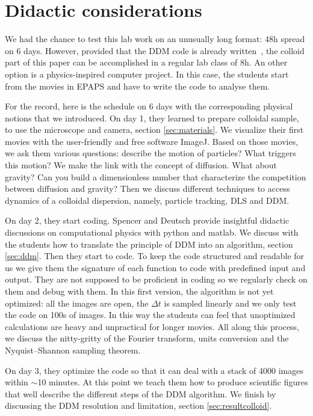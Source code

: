 \documentclass[prb,reprint,amsmath,amssymb]{revtex4-1}
\newcommand{\tg}[1]{{\color{magenta}#1}} %
\begin{document}
\section{\label{sec:didac}Didactic considerations}
\tg{We had the chance to test this lab work on an unusually long format: 48h spread on 6 days. However, provided that the DDM code is already written~\cite{code_github}, the colloid part of this paper can be accomplished in a regular lab class of 8h. An other option is a physics-inspired computer project. In this case, the students start from the movies in EPAPS and have to write the code to analyse them.}

For the record, here is the schedule on 6 days with the corresponding physical notions that we introduced. On day 1, they learned to prepare colloidal sample, to use the microscope and camera, section \ref{sec:materials}. We visualize their first movies with the user-friendly and free software  ImageJ. Based on those movies, we ask them various questions: describe the motion of particles? What triggers this motion? We make the link with the concept of diffusion. What about gravity? Can you build a dimensionless number that characterize the competition between diffusion and gravity? Then we discuss different techniques to access dynamics of a colloidal dispersion, namely, particle tracking, DLS and DDM.

On day 2, they start coding. Spencer and Deutsch provide insightful didactic discussions on computational physics with python\cite{ajp2014deutsh} and matlab\cite{ajp2005spencer}. We discuss with the students how to translate the principle of DDM into an algorithm, section \ref{sec:ddm}. Then they start to code. To keep the code structured and readable for us we give them the signature of each function to code with predefined input and output. They are not supposed to be proficient in coding so we regularly check on them and debug with them. In this first version, the algorithm is not yet optimized: all the images are open, the $\Delta t$ is sampled linearly and we only test the code on 100s of images. In this way the students can feel that unoptimized  calculations are heavy and unpractical for longer movies. All along this process, we discuss the nitty-gritty of the Fourier transform, units conversion and the Nyquist–Shannon sampling theorem.

On day 3, they optimize the code so that it can deal with a stack of 4000 images within $\sim$10 minutes. At this point we teach them how to produce scientific figures that well describe the different steps of the DDM algorithm. We finish by discussing the DDM resolution and limitation, section \ref{sec:resultcolloid}.
\end{document}
